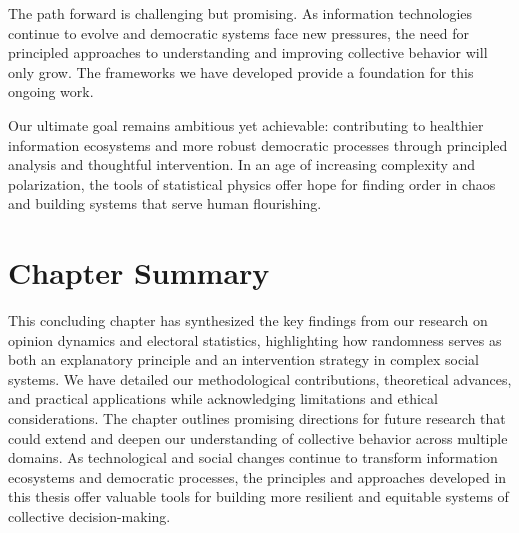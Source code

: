 The path forward is challenging but promising. As information technologies continue to evolve and democratic systems face new pressures, the need for principled approaches to understanding and improving collective behavior will only grow. The frameworks we have developed provide a foundation for this ongoing work.

Our ultimate goal remains ambitious yet achievable: contributing to healthier information ecosystems and more robust democratic processes through principled analysis and thoughtful intervention. In an age of increasing complexity and polarization, the tools of statistical physics offer hope for finding order in chaos and building systems that serve human flourishing.

\section{Chapter Summary}

This concluding chapter has synthesized the key findings from our research on opinion dynamics and electoral statistics, highlighting how randomness serves as both an explanatory principle and an intervention strategy in complex social systems. We have detailed our methodological contributions, theoretical advances, and practical applications while acknowledging limitations and ethical considerations. The chapter outlines promising directions for future research that could extend and deepen our understanding of collective behavior across multiple domains. As technological and social changes continue to transform information ecosystems and democratic processes, the principles and approaches developed in this thesis offer valuable tools for building more resilient and equitable systems of collective decision-making. 